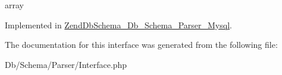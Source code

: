 array 

\-Implemented in \hyperlink{classZendDbSchema__Db__Schema__Parser__Mysql_aaf36af5205b7906b12dc61f6f098f1f6}{\-Zend\-Db\-Schema\-\_\-\-Db\-\_\-\-Schema\-\_\-\-Parser\-\_\-\-Mysql}.



\-The documentation for this interface was generated from the following file\-:\begin{DoxyCompactItemize}
\item 
\-Db/\-Schema/\-Parser/\-Interface.\-php\end{DoxyCompactItemize}
